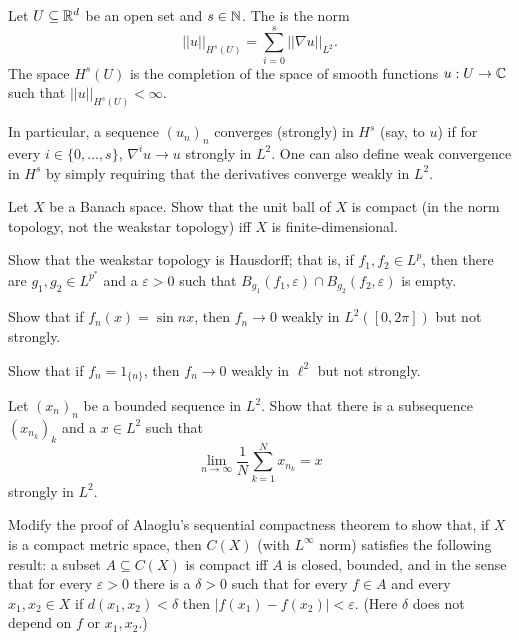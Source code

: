 \begin{definition}
Let $U \subseteq \mathbb{R}^d$ be an open set and $s \in \mathbb{N}$.
The  is the norm
\[||u||_{H^s(U)} = \sum_{i=0}^s ||\nabla u||_{L^2}.\]
The space $H^s(U)$ is the completion of the space of smooth functions $u: U \to \mathbb{C}$ such that $||u||_{H^s(U)} < \infty$.
\end{definition}
In particular, a sequence $(u_n)_n$ converges (strongly) in $H^s$ (say, to $u$) if for every $i \in \{0, \dots, s\}$, $\nabla^iu \to u$ strongly in $L^2$.
One can also define weak convergence in $H^s$ by simply requiring that the derivatives converge weakly in $L^2$.

\begin{exercise}
\label{unit ball compactness}
Let $X$ be a Banach space. Show that the unit ball of $X$ is compact (in the norm topology, not the weakstar topology) iff $X$ is finite-dimensional.
\end{exercise}

\begin{exercise}
\label{weakstar is hausdorff}
Show that the weakstar topology is Hausdorff; that is, if $f_1, f_2 \in L^p$, then there are $g_1, g_2 \in L^{p^*}$ and a $\varepsilon > 0$ such that $B_{g_1}(f_1, \varepsilon) \cap B_{g_2}(f_2, \varepsilon)$ is empty.
\end{exercise}

\begin{exercise}
Show that if $f_n(x) = \sin nx$, then $f_n \to 0$ weakly in $L^2([0, 2\pi])$ but not strongly.
\end{exercise}

\begin{exercise}
Show that if $f_n = 1_{\{n\}}$, then $f_n \to 0$ weakly in $\ell^2$ but not strongly.
\end{exercise}

\begin{exercise}
Let $(x_n)_n$ be a bounded sequence in $L^2$. Show that there is a subsequence $(x_{n_k})_k$ and a $x \in L^2$ such that
\[\lim_{n \to \infty} \frac{1}{N} \sum_{k=1}^N x_{n_k} = x\]
strongly in $L^2$.
\end{exercise}

\begin{exercise}
\label{Ascoli}
Modify the proof of Alaoglu's sequential compactness theorem to show that, if $X$ is a compact metric space, then $C(X)$ (with $L^\infty$ norm) satisfies the following result: a subset $A \subseteq C(X)$ is compact iff $A$ is closed, bounded, and  in the sense that for every $\varepsilon > 0$ there is a $\delta > 0$ such that for every $f \in A$ and every $x_1,x_2 \in X$ if $d(x_1, x_2) < \delta$ then $|f(x_1) - f(x_2)| < \varepsilon$. (Here $\delta$ does not depend on $f$ or $x_1, x_2$.)
\end{exercise}

